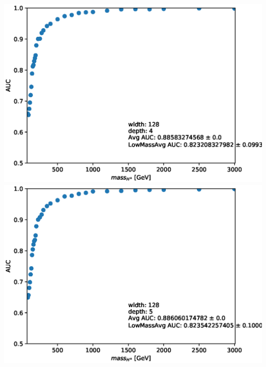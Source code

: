 \documentclass[aspectratio=169,xcolor=table]{beamer}
\begin{document}
\begin{frame}
\begin{columns}
      \includegraphics[height=.25\textheight,keepaspectratio=true]{AUC_Plots/model_GB_1024_channel_taulep_mass_80to3000_ntracks_1_nfolds_5_fold_4_nvars_19_batch_size_1024_epochs_1000_dense_layer_size_128_activation_function_LeakyRelu_depth_4_loss_binary_crossentropy_dropout_0.1_alpha_0.05.eps}
      \includegraphics[height=.25\textheight,keepaspectratio=true]{AUC_Plots/model_GB_1024_channel_taulep_mass_80to3000_ntracks_1_nfolds_5_fold_4_nvars_19_batch_size_1024_epochs_1000_dense_layer_size_128_activation_function_LeakyRelu_depth_5_loss_binary_crossentropy_dropout_0.1_alpha_0.05.eps}


\end{columns}
\end{frame}
\end{document}
